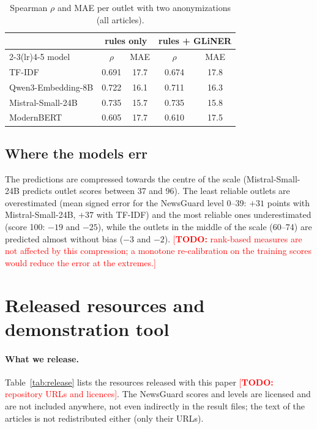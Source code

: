 \documentclass[11pt,a4paper]{article}
\newcommand{\todo}[1]{\textcolor{red}{[\textbf{TODO:} #1]}}
\begin{document}
\begin{table}[t]
\centering
\caption{Spearman $\rho$ and MAE per outlet with two anonymizations (all articles).}\label{tab:anon}
\begin{tabular}{lcccc}
\toprule
& \multicolumn{2}{c}{rules only} & \multicolumn{2}{c}{rules + GLiNER} \\
\cmidrule(lr){2-3}\cmidrule(lr){4-5}
model & $\rho$ & MAE & $\rho$ & MAE \\
\midrule
TF-IDF & 0.691 & 17.7 & 0.674 & 17.8 \\
Qwen3-Embedding-8B & 0.722 & 16.1 & 0.711 & 16.3 \\
Mistral-Small-24B & 0.735 & 15.7 & 0.735 & 15.8 \\
ModernBERT & 0.605 & 17.7 & 0.610 & 17.5 \\
\bottomrule
\end{tabular}
\end{table}

\subsection{Where the models err}
The predictions are compressed towards the centre of the scale (Mistral-Small-24B predicts outlet scores between 37
and 96). The least reliable outlets are overestimated (mean signed error for the NewsGuard level 0--39: $+31$ points
with Mistral-Small-24B, $+37$ with TF-IDF) and the most reliable ones underestimated (score 100: $-19$ and $-25$),
while the outlets in the middle of the scale (60--74) are predicted almost without bias ($-3$ and $-2$).
\todo{rank-based measures are not affected by this compression; a monotone re-calibration on the training scores would
reduce the error at the extremes.}

\section{Released resources and demonstration tool}\label{sec:tool}

\paragraph{What we release.} Table~\ref{tab:release} lists the resources released with this paper
\todo{repository URLs and licences}. The NewsGuard scores and levels are licensed and are not included anywhere, not
even indirectly in the result files; the text of the articles is not redistributed either (only their URLs).
\end{document}
